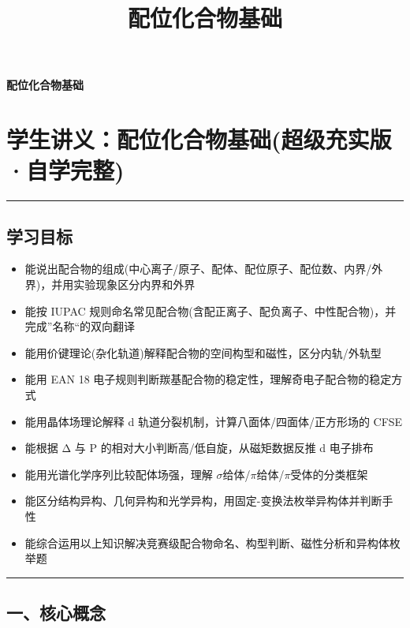 \documentclass[a4paper,11pt]{ctexart}
\title{配位化合物基础}
\date{}
\providecommand{\tightlist}{\setlength{\itemsep}{0pt}\setlength{\parskip}{0pt}}
\newcommand{\箭}{\ensuremath{\rightarrow}}
\newcommand{\左箭}{\ensuremath{\leftarrow}}
\newcommand{\上箭}{\ensuremath{\uparrow}}
\newcommand{\下箭}{\ensuremath{\downarrow}}
\newcommand{\衡}{\ensuremath{\rightleftharpoons}}
\newcommand{\双箭}{\ensuremath{\leftrightarrow}}
\newcommand{\约等于}{\ensuremath{\approx}}
\newcommand{\小于等于}{\ensuremath{\leq}}
\newcommand{\大于等于}{\ensuremath{\geq}}
\newcommand{\不等于}{\ensuremath{\neq}}
\newcommand{\西格马}{\ensuremath{\sigma}}
\newcommand{\派}{\ensuremath{\pi}}
\begin{document}
\thispagestyle{plain}
\begin{center}
{\bfseries 配位化合物基础\par}
\end{center}
\vspace{1em}
\section{学生讲义：配位化合物基础(超级充实版·自学完整)}\label{ux5b66ux751fux8bb2ux4e49ux914dux4f4dux5316ux5408ux7269ux57faux7840ux8d85ux7ea7ux5145ux5b9eux7248ux81eaux5b66ux5b8cux6574}

\begin{center}\rule{0.5\linewidth}{0.5pt}\end{center}

\subsection{学习目标}\label{ux5b66ux4e60ux76eeux6807}

\begin{itemize}
\tightlist
\item
  能说出配合物的组成(中心离子/原子、配体、配位原子、配位数、内界/外界)，并用实验现象区分内界和外界
\item
  能按 IUPAC 规则命名常见配合物(含配正离子、配负离子、中性配合物)，并完成''名称``的双向翻译
\item
  能用价键理论(杂化轨道)解释配合物的空间构型和磁性，区分内轨/外轨型
\item
  能用 EAN 18 电子规则判断羰基配合物的稳定性，理解奇电子配合物的稳定方式
\item
  能用晶体场理论解释 d 轨道分裂机制，计算八面体/四面体/正方形场的 CFSE
\item
  能根据 Δ 与 P 的相对大小判断高/低自旋，从磁矩数据反推 d 电子排布
\item
  能用光谱化学序列比较配体场强，理解 \西格马 给体/\派 给体/\派 受体的分类框架
\item
  能区分结构异构、几何异构和光学异构，用固定-变换法枚举异构体并判断手性
\item
  能综合运用以上知识解决竞赛级配合物命名、构型判断、磁性分析和异构体枚举题
\end{itemize}

\begin{center}\rule{0.5\linewidth}{0.5pt}\end{center}

\subsection{一、核心概念}\label{ux4e00ux6838ux5fc3ux6982ux5ff5}
\end{document}

